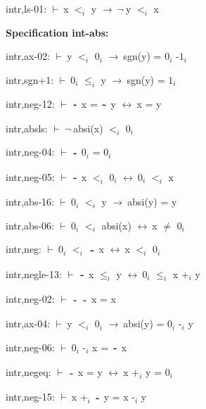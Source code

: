 \documentclass[a4paper]{article}
\newcommand{\tildesym}{\raisebox{-4pt}{\bf\~{}}}
\newcommand{\Fol}{\mbox{$\vdash\ $}}
\newcommand{\Not}{\mbox{$\neg\ $}}
\newcommand{\Imp}{\mbox{$\rightarrow\ $}}
\newcommand{\Equiv}{\mbox{$\leftrightarrow\ $}}
\begin{document}
intr,ls-01: 
 \Fol x $\mbox{$<$}_{i}$ y \Imp \Not y $\mbox{$<$}_{i}$ x



{\bf Specification int-abs:}

intr,ax-02: 
 \Fol y $\mbox{$<$}_{i}$ $\mbox{0}_{i}$ \Imp sgn(y) = $\mbox{0}_{i}$ $\mbox{-1}_{i}$



intr,sgn+1: 
 \Fol $\mbox{0}_{i}$ $\mbox{$\le$}_{i}$ y \Imp sgn(y) = $\mbox{1}_{i}$



intr,neg-12: 
 \Fol $\tildesym$ x = $\tildesym$ y \Equiv x = y



intr,absls: 
 \Fol \Not absi(x) $\mbox{$<$}_{i}$ $\mbox{0}_{i}$



intr,neg-04: 
 \Fol $\tildesym$ $\mbox{0}_{i}$ = $\mbox{0}_{i}$



intr,neg-05: 
 \Fol $\tildesym$ x $\mbox{$<$}_{i}$ $\mbox{0}_{i}$ \Equiv $\mbox{0}_{i}$ $\mbox{$<$}_{i}$ x



intr,abs-16: 
 \Fol $\mbox{0}_{i}$ $\mbox{$<$}_{i}$ y \Imp absi(y) = y



intr,abs-06: 
 \Fol $\mbox{0}_{i}$ $\mbox{$<$}_{i}$ absi(x) \Equiv x $\neq$ $\mbox{0}_{i}$



intr,neg: 
 \Fol $\mbox{0}_{i}$ $\mbox{$<$}_{i}$ $\tildesym$ x \Equiv x $\mbox{$<$}_{i}$ $\mbox{0}_{i}$



intr,negle-13: 
 \Fol $\tildesym$ x $\mbox{$\le$}_{i}$ y \Equiv $\mbox{0}_{i}$ $\mbox{$\le$}_{i}$ x $\mbox{+}_{i}$ y



intr,neg-02: 
 \Fol $\tildesym$ $\tildesym$ x = x



intr,ax-04: 
 \Fol y $\mbox{$<$}_{i}$ $\mbox{0}_{i}$ \Imp absi(y) = $\mbox{0}_{i}$ $\mbox{-}_{i}$ y



intr,neg-06: 
 \Fol $\mbox{0}_{i}$ $\mbox{-}_{i}$ x = $\tildesym$ x



intr,negeq: 
 \Fol $\tildesym$ x = y \Equiv x $\mbox{+}_{i}$ y = $\mbox{0}_{i}$



intr,neg-15: 
 \Fol x $\mbox{+}_{i}$ $\tildesym$ y = x $\mbox{-}_{i}$ y
\end{document}
